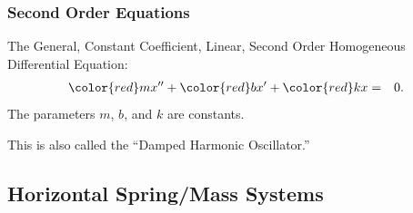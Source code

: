 \begin{frame}
  \frametitle{Second Order Equations}

  The General, Constant Coefficient, Linear, Second Order Homogeneous
  Differential Equation:
  \begin{eqnarray*}
    {\color{red}m} x'' + {\color{red}b} x' + {\color{red}k}x & = & 0.
  \end{eqnarray*}
  The parameters {\color{red}$m$}, {\color{red}$b$}, and {\color{red}$k$} are constants.

  This is also called the ``Damped Harmonic Oscillator.''

\end{frame}

\subsection{Horizontal Spring/Mass Systems}

